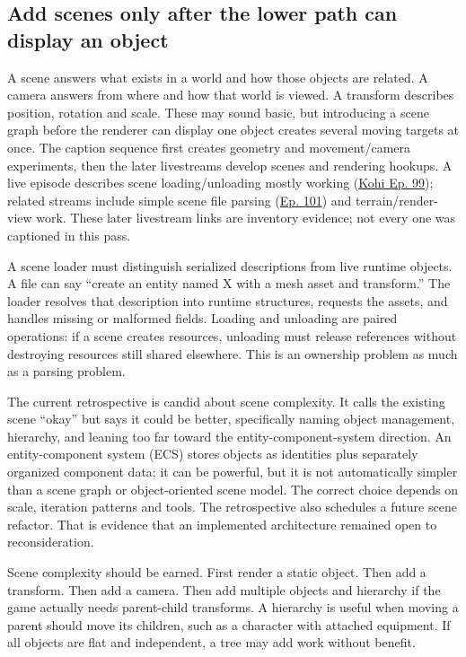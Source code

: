 \subsection{Add scenes only after the lower path can display an object}\label{06-engine-ii-ch032-add-scenes-only-after-the-lower-path-can-display-an-object}

A scene answers what exists in a world and how those objects are related. A camera answers from where and how that world is viewed. A transform describes position, rotation and scale. These may sound basic, but introducing a scene graph before the renderer can display one object creates several moving targets at once. The caption sequence first creates geometry and movement/camera experiments, then the later livestreams develop scenes and rendering hookups. A live episode describes scene loading/unloading mostly working (\href{https://www.youtube.com/watch?v=N7sc-i-wryw}{Kohi Ep. 99}); related streams include simple scene file parsing (\href{https://www.youtube.com/watch?v=q8AfndGO-Ms}{Ep. 101}) and terrain/render-view work. These later livestream links are inventory evidence; not every one was captioned in this pass.

A scene loader must distinguish serialized descriptions from live runtime objects. A file can say ``create an entity named X with a mesh asset and transform.'' The loader resolves that description into runtime structures, requests the assets, and handles missing or malformed fields. Loading and unloading are paired operations: if a scene creates resources, unloading must release references without destroying resources still shared elsewhere. This is an ownership problem as much as a parsing problem.

The current retrospective is candid about scene complexity. It calls the existing scene ``okay'' but says it could be better, specifically naming object management, hierarchy, and leaning too far toward the entity-component-system direction. An entity-component system (ECS) stores objects as identities plus separately organized component data; it can be powerful, but it is not automatically simpler than a scene graph or object-oriented scene model. The correct choice depends on scale, iteration patterns and tools. The retrospective also schedules a future scene refactor. That is evidence that an implemented architecture remained open to reconsideration.

Scene complexity should be earned. First render a static object. Then add a transform. Then add a camera. Then add multiple objects and hierarchy if the game actually needs parent-child transforms. A hierarchy is useful when moving a parent should move its children, such as a character with attached equipment. If all objects are flat and independent, a tree may add work without benefit.


